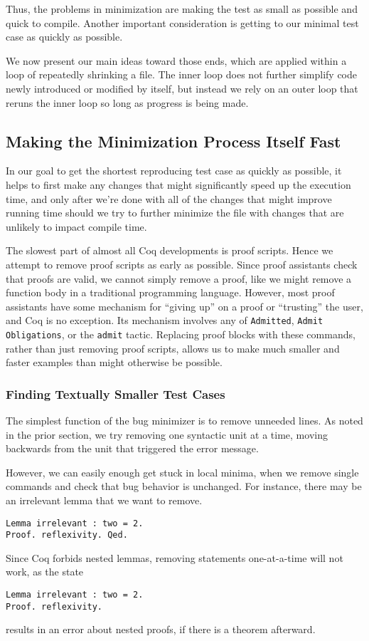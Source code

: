 \documentclass[a4paper,USenglish,cleveref,autoref,thm-restate]{lipics-v2021}
\begin{document}
Thus, the problems in minimization are making the test as small as possible and quick to compile.
Another important consideration is getting to our minimal test case as quickly as possible.

We now present our main ideas toward those ends, which are applied within a loop of repeatedly shrinking a file.
The inner loop does not further simplify code newly introduced or modified by itself, but instead we rely on an outer loop that reruns the inner loop so long as progress is being made.

\subsection{Making the Minimization Process Itself Fast}

In our goal to get the shortest reproducing test case as quickly as possible, it helps to first make any changes that might significantly speed up the execution time, and only after we're done with all of the changes that might improve running time should we try to further minimize the file with changes that are unlikely to impact compile time.

The slowest part of almost all Coq developments is proof scripts.
Hence we attempt to remove proof scripts as early as possible.
Since proof assistants check that proofs are valid, we cannot simply remove a proof, like we might remove a function body in a traditional programming language.
However, most proof assistants have some mechanism for ``giving up'' on a proof or ``trusting'' the user, and Coq is no exception.
Its mechanism involves any of \verb|Admitted|, \verb|Admit Obligations|, or the \verb|admit| tactic.
Replacing proof blocks with these commands, rather than just removing proof scripts, allows us to make much smaller and faster examples than might otherwise be possible.

\subsubsection{Finding Textually Smaller Test Cases}

The simplest function of the bug minimizer is to remove unneeded lines.
As noted in the prior section, we try removing one syntactic unit at a time, moving backwards from the unit that triggered the error message.

However, we can easily enough get stuck in local minima, when we remove single commands and check that bug behavior is unchanged.
For instance, there may be an irrelevant lemma that we want to remove.
\begin{verbatim}
Lemma irrelevant : two = 2.
Proof. reflexivity. Qed.
\end{verbatim}
Since Coq forbids nested lemmas, removing statements one-at-a-time will not work, as the state
\begin{verbatim}
Lemma irrelevant : two = 2.
Proof. reflexivity.
\end{verbatim}
results in an error about nested proofs, if there is a theorem afterward.
\end{document}
